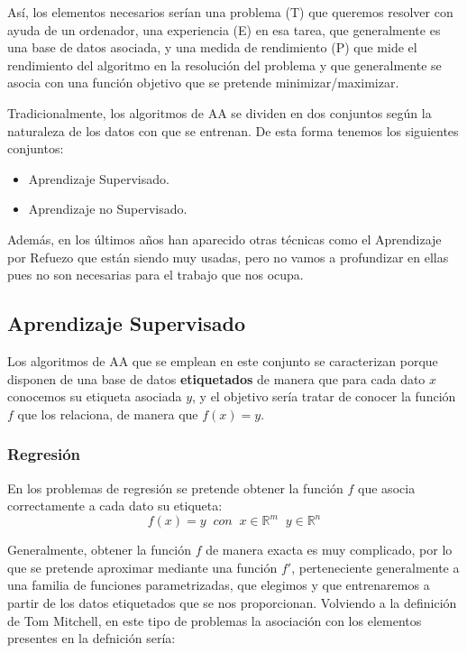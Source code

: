     \medskip

    \noindent Así, los elementos necesarios serían una problema (T) que queremos resolver con ayuda de un ordenador, una experiencia (E) en esa tarea, que generalmente es una base de datos asociada, y una medida de rendimiento (P) que mide el rendimiento del algoritmo en la resolución del problema y que generalmente se asocia con una función objetivo que se pretende minimizar/maximizar.

    \medskip

    \noindent Tradicionalmente, los algoritmos de AA se dividen en dos conjuntos según la naturaleza de los datos con que se entrenan. De esta forma tenemos los siguientes conjuntos:

    \begin{itemize}
        \item Aprendizaje Supervisado.
        \item Aprendizaje no Supervisado.
    \end{itemize}

    \medskip 
    
    \noindent Además, en los últimos años han aparecido otras técnicas como el Aprendizaje por Refuezo que están siendo muy usadas, pero no vamos a profundizar en ellas pues no son necesarias para el trabajo que nos ocupa.

    \subsection{Aprendizaje Supervisado}
        \noindent Los algoritmos de AA que se emplean en este conjunto se caracterizan porque disponen de una base de datos \textbf{etiquetados} de manera que para cada dato $x$ conocemos su etiqueta asociada $y$, y el objetivo sería tratar de conocer la función $f$ que los relaciona, de manera que $f(x)=y$.

        \subsubsection{Regresión} \label{section::Regresion}
            \noindent En los problemas de regresión se pretende obtener la función $f$ que asocia correctamente a cada dato su etiqueta: 
            \begin{equation}
                f(x)=y \; \; con \; \; x\in \mathbb{R}^m \; \; y \in \mathbb{R}^n
            \end{equation}
            
            \noindent Generalmente, obtener la función $f$ de manera exacta es muy complicado, por lo que se pretende aproximar mediante una función $f'$, perteneciente generalmente a una familia de funciones parametrizadas, que elegimos y que entrenaremos a partir de los datos etiquetados que se nos proporcionan. Volviendo a la definición de Tom Mitchell, en este tipo de problemas la asociación con los elementos presentes en la defnición sería:
            
